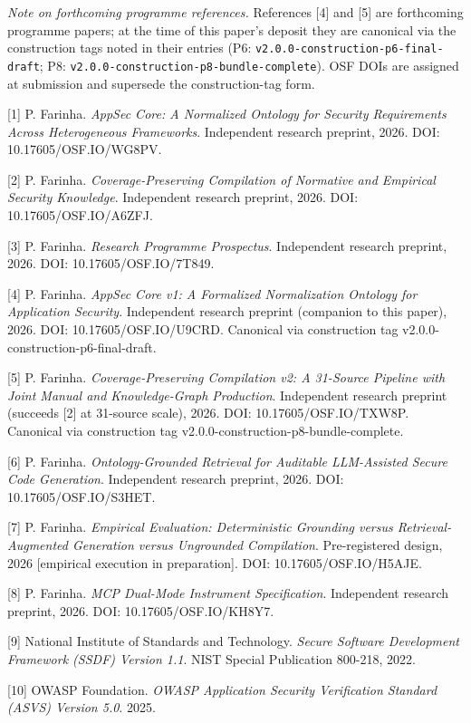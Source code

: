 \documentclass[
]{article}
\begin{document}
\emph{Note on forthcoming programme references.} References {[}4{]} and
{[}5{]} are forthcoming programme papers; at the time of this paper's
deposit they are canonical via the construction tags noted in their
entries (P6: \texttt{v2.0.0-construction-p6-final-draft}; P8:
\texttt{v2.0.0-construction-p8-bundle-complete}). OSF DOIs are assigned
at submission and supersede the construction-tag form.

{[}1{]} P. Farinha. \emph{AppSec Core: A Normalized Ontology for
Security Requirements Across Heterogeneous Frameworks}. Independent
research preprint, 2026. DOI: 10.17605/OSF.IO/WG8PV.

{[}2{]} P. Farinha. \emph{Coverage-Preserving Compilation of Normative
and Empirical Security Knowledge}. Independent research preprint, 2026.
DOI: 10.17605/OSF.IO/A6ZFJ.

{[}3{]} P. Farinha. \emph{Research Programme Prospectus}. Independent
research preprint, 2026. DOI: 10.17605/OSF.IO/7T849.

{[}4{]} P. Farinha. \emph{AppSec Core v1: A Formalized Normalization
Ontology for Application Security}. Independent research preprint
(companion to this paper), 2026. DOI: 10.17605/OSF.IO/U9CRD. Canonical
via construction tag v2.0.0-construction-p6-final-draft.

{[}5{]} P. Farinha. \emph{Coverage-Preserving Compilation v2: A
31-Source Pipeline with Joint Manual and Knowledge-Graph Production}.
Independent research preprint (succeeds {[}2{]} at 31-source scale),
2026. DOI: 10.17605/OSF.IO/TXW8P. Canonical via construction tag
v2.0.0-construction-p8-bundle-complete.

{[}6{]} P. Farinha. \emph{Ontology-Grounded Retrieval for Auditable
LLM-Assisted Secure Code Generation}. Independent research preprint,
2026. DOI: 10.17605/OSF.IO/S3HET.

{[}7{]} P. Farinha. \emph{Empirical Evaluation: Deterministic Grounding
versus Retrieval-Augmented Generation versus Ungrounded Compilation}.
Pre-registered design, 2026 {[}empirical execution in preparation{]}.
DOI: 10.17605/OSF.IO/H5AJE.

{[}8{]} P. Farinha. \emph{MCP Dual-Mode Instrument Specification}.
Independent research preprint, 2026. DOI: 10.17605/OSF.IO/KH8Y7.

{[}9{]} National Institute of Standards and Technology. \emph{Secure
Software Development Framework (SSDF) Version 1.1}. NIST Special
Publication 800-218, 2022.

{[}10{]} OWASP Foundation. \emph{OWASP Application Security Verification
Standard (ASVS) Version 5.0}. 2025.
\end{document}
